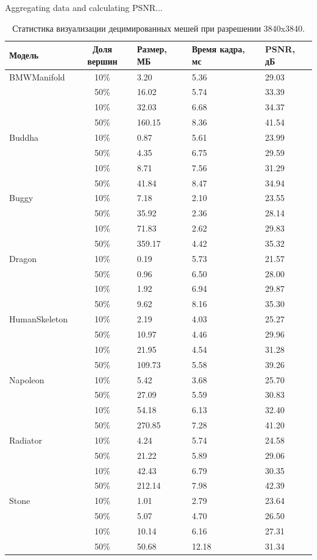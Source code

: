 Aggregating data and calculating PSNR...
\begin{table}[htbp]
  \centering
  \scriptsize
  \caption{Статистика визуализации децимированных мешей при разрешении 3840x3840.}
  \label{tab:decimated_stats_3840}
  \begin{tabular}{lcp{2cm}p{2.5cm}p{2.5cm}}
    \toprule
    \textbf{Модель} & \textbf{Доля вершин} & \textbf{Размер, МБ} & \textbf{Время кадра, мс} & \textbf{PSNR, дБ} \\
\midrule
    BMWManifold & 10\% & 3.20 & 5.36 & 29.03 \\
     & 50\% & 16.02 & 5.74 & 33.39 \\
     & 10\% & 32.03 & 6.68 & 34.37 \\
     & 50\% & 160.15 & 8.36 & 41.54 \\
    \midrule
    Buddha & 10\% & 0.87 & 5.61 & 23.99 \\
     & 50\% & 4.35 & 6.75 & 29.59 \\
     & 10\% & 8.71 & 7.56 & 31.29 \\
     & 50\% & 41.84 & 8.47 & 34.94 \\
    \midrule
    Buggy & 10\% & 7.18 & 2.10 & 23.55 \\
     & 50\% & 35.92 & 2.36 & 28.14 \\
     & 10\% & 71.83 & 2.62 & 29.83 \\
     & 50\% & 359.17 & 4.42 & 35.32 \\
    \midrule
    Dragon & 10\% & 0.19 & 5.73 & 21.57 \\
     & 50\% & 0.96 & 6.50 & 28.00 \\
     & 10\% & 1.92 & 6.94 & 29.87 \\
     & 50\% & 9.62 & 8.16 & 35.30 \\
    \midrule
    HumanSkeleton & 10\% & 2.19 & 4.03 & 25.27 \\
     & 50\% & 10.97 & 4.46 & 29.96 \\
     & 10\% & 21.95 & 4.54 & 31.28 \\
     & 50\% & 109.73 & 5.58 & 39.26 \\
    \midrule
    Napoleon & 10\% & 5.42 & 3.68 & 25.70 \\
     & 50\% & 27.09 & 5.59 & 30.83 \\
     & 10\% & 54.18 & 6.13 & 32.40 \\
     & 50\% & 270.85 & 7.28 & 41.20 \\
    \midrule
    Radiator & 10\% & 4.24 & 5.74 & 24.58 \\
     & 50\% & 21.22 & 5.89 & 29.06 \\
     & 10\% & 42.43 & 6.79 & 30.35 \\
     & 50\% & 212.14 & 7.98 & 42.39 \\
    \midrule
    Stone & 10\% & 1.01 & 2.79 & 23.64 \\
     & 50\% & 5.07 & 4.70 & 26.50 \\
     & 10\% & 10.14 & 6.16 & 27.31 \\
     & 50\% & 50.68 & 12.18 & 31.34 \\
    \bottomrule
  \end{tabular}
\end{table}

